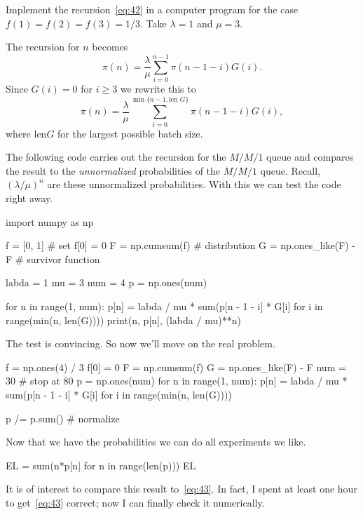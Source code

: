 \begin{exercise}
  Implement the recursion~\cref{eq:42} in a computer program for the case $f(1)=f(2)=f(3)=1/3$.
  Take $\lambda =1$ and $\mu = 3$.
  \begin{solution}
    The recursion for $n$ becomes
\begin{equation*}
\pi(n) = \frac \lambda \mu \sum_{i=0}^{n-1} \pi(n-1-i)G(i).
\end{equation*}
Since $G(i) =0$ for $i\geq 3$ we rewrite this to 
\begin{equation*}
  \pi(n) = \frac\lambda \mu \sum_{i=0}^{\min\{n-1,\text{len } G\}} \pi(n-1-i)G(i),
\end{equation*}
where $\text{len} G$ for the largest possible batch size.

The following code carries out the recursion for the $M/M/1$ queue and compares the result to the \emph{unnormalized} probabilities of the $M/M/1$ queue.
Recall, $(\lambda/\mu)^n$ are these unnormalized probabilities.
With this we can test the code right away.

\begin{pyconsole}
import numpy as np

f = [0, 1] # set f[0] = 0
F = np.cumsum(f) # distribution 
G = np.ones_like(F) - F # survivor function

labda = 1
mu = 3
num = 4
p = np.ones(num)

for n in range(1, num):
    p[n] = labda / mu * sum(p[n - 1 - i] * G[i] for i in range(min(n, len(G))))
    print(n, p[n], (labda / mu)**n)

\end{pyconsole}
The test is convincing. So now we'll move on the real problem. 

\begin{pyconsole}
f = np.ones(4) / 3
f[0] = 0
F = np.cumsum(f)
G = np.ones_like(F) - F
num = 30 # stop at 80
p = np.ones(num)
for n in range(1, num):
    p[n] = labda / mu * sum(p[n - 1 - i] * G[i] for i in range(min(n, len(G))))

p /= p.sum()  # normalize
\end{pyconsole}

Now that we have the probabilities we can do all experiments we like. 
\begin{pyconsole}
EL = sum(n*p[n] for n in range(len(p)))
EL 
\end{pyconsole}

It is of interest to compare this result to~\cref{eq:43}.
In fact, I spent at least one hour to get~\cref{eq:43} correct; now I can finally check it numerically.



\end{solution}
\end{exercise}

